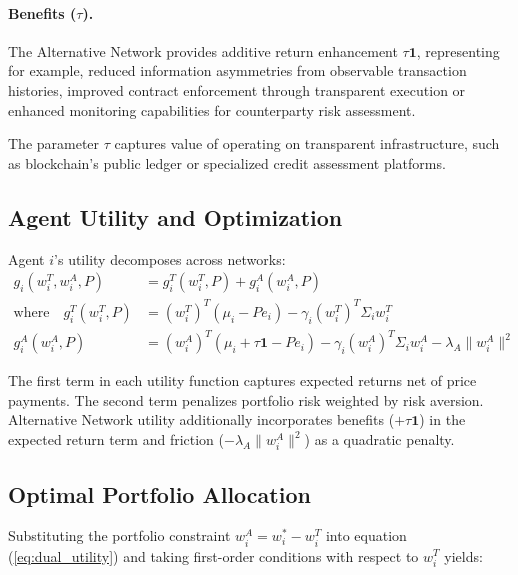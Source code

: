 \documentclass[12pt]{article}
\begin{document}
\paragraph{Benefits ($\tau$).} The Alternative Network provides additive return enhancement $\tau \mathbf{1}$, representing for example, reduced information asymmetries from observable transaction histories, improved contract enforcement through transparent execution or enhanced monitoring capabilities for counterparty risk assessment.

The parameter $\tau$ captures value of operating on transparent infrastructure, such as blockchain's public ledger or specialized credit assessment platforms.

\subsection{Agent Utility and Optimization}

Agent $i$'s utility decomposes across networks:
\begin{align}
g_i(w_i^T, w_i^A, P) &= g_i^T(w_i^T, P) + g_i^A(w_i^A, P) \label{eq:dual_utility} \\
\text{where} \quad g_i^T(w_i^T, P) &= (w_i^T)^T(\mu_i - Pe_i) - \gamma_i (w_i^T)^T\Sigma_i w_i^T \label{eq:utility_T} \\
g_i^A(w_i^A, P) &= (w_i^A)^T(\mu_i + \tau \mathbf{1} - Pe_i) - \gamma_i (w_i^A)^T\Sigma_i w_i^A - \lambda_A\|w_i^A\|^2 \label{eq:utility_A}
\end{align}

The first term in each utility function captures expected returns net of price payments. The second term penalizes portfolio risk weighted by risk aversion. Alternative Network utility additionally incorporates benefits ($+\tau \mathbf{1}$) in the expected return term and friction ($-\lambda_A\|w_i^A\|^2$) as a quadratic penalty.

\subsection{Optimal Portfolio Allocation}

Substituting the portfolio constraint $w_i^A = w_i^* - w_i^T$ into equation (\ref{eq:dual_utility}) and taking first-order conditions with respect to $w_i^T$ yields:
\end{document}
